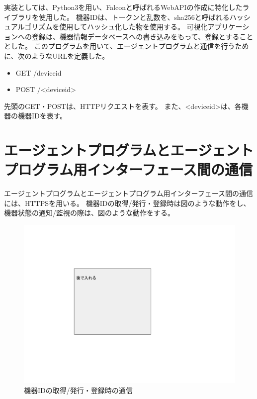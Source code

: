 実装としては、Python3を用い、Falconと呼ばれるWebAPIの作成に特化したライブラリを使用した。
機器IDは、トークンと乱数を、sha256と呼ばれるハッシュアルゴリズムを使用してハッシュ化した物を使用する。
可視化アプリケーションへの登録は、機器情報データベースへの書き込みをもって、登録とすることとした。
このプログラムを用いて、エージェントプログラムと通信を行うために、次のようなURLを定義した。
\begin{itemize}
	\item GET /deviceid
	\item POST /<deviceid>
\end{itemize}
先頭のGET・POSTは、HTTPリクエストを表す。
また、<deviceid>は、各機器の機器IDを表す。

\section{エージェントプログラムとエージェントプログラム用インターフェース間の通信}
エージェントプログラムとエージェントプログラム用インターフェース間の通信には、HTTPSを用いる。
機器IDの取得/発行・登録時は図のような動作をし、機器状態の通知/監視の際は、図のような動作をする。
\begin{figure}[htbp]
\includegraphics[width=16cm]{images/test.png}
\caption{機器IDの取得/発行・登録時の通信}
\label{fig:inter_program_regist}
\end{figure}
